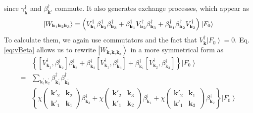 \documentclass[epj]{svjour}
\newcommand{\vk}{\ensuremath{\mathbf{k}}}
\begin{document}
since $\gamma^{\dagger}_{\mathbf{k}}$ and $\beta^{\dagger}_{\mathbf{k}'}$ commute.  It also generates exchange processes, which appear as 
\begin{equation}
\left|W_{\mathbf{k} _1\mathbf{k} _2\mathbf{k} _3}\right> =\left(V^{\dagger}_{\mathbf{k} _1}\beta^{\dagger}_{\mathbf{k}
_2}\beta^{\dagger}_{\mathbf{k} _3}+\beta^{\dagger}_{\mathbf{k}
_1}V^{\dagger}_{\mathbf{k} _2}\beta^{\dagger}_{\mathbf{k} _3}+\beta^{%
\dagger}_{\mathbf{k} _1}\beta^{\dagger}_{\mathbf{k} _2}V^{\dagger}_{\mathbf{k%
} _3}\right) \left|F_0\right>  
\end{equation}
To calculate them, we again use commutators and the fact that $V^{\dagger}_\vk\left|F_0\right>  =0$. 
Eq. \eqref{eq:vBeta} allows us to rewrite  $\left|W_{\mathbf{k} _1\mathbf{k} _2\mathbf{k} _3}\right>$ in a more symmetrical form as
\begin{equation}  \label{eq:vThree2}
\begin{split}
&\left\{\left[V^{\dagger}_{\mathbf{k} _1},\beta^{\dagger}_{\mathbf{k} _2}%
\right]  \beta^{\dagger}_{\mathbf{k} _3}+\beta^{\dagger}_{\mathbf{k} _2}%
\left[V^{\dagger}_{\mathbf{k} _1},\beta^{\dagger}_{\mathbf{k} _3}\right] 
+\beta^{\dagger}_{\mathbf{k} _1}\left[V^{\dagger}_{\mathbf{k}
_2},\beta^{\dagger}_{\mathbf{k} _3}\right]  \right\} \left|F_0\right>   \\
=&\sum_{\vk^{\prime}_1\mathbf{k} ^{\prime}_2}\beta^{\dagger}_{\mathbf{k}
^{\prime}_1}\beta^{\dagger}_{\mathbf{k} ^{\prime}_2} \\
&\left\{\chi\left(\begin{smallmatrix}\vk'_2&\vk_2\\\vk'_1&\vk_1%
\end{smallmatrix}\right)  \beta^{\dagger}_{\mathbf{k} _3}+\chi\left(%
\begin{smallmatrix}\vk'_2&\vk_3\\\vk'_1&\vk_2\end{smallmatrix}\right) 
\beta^{\dagger}_{\mathbf{k} _1}+\chi\left(\begin{smallmatrix}\vk'_2&\vk_1\
\\\vk'_1&\vk_3\end{smallmatrix}\right)  \beta^{\dagger}_{\mathbf{k}
_2}\right\} \left|F_0\right>  
\end{split}%
\end{equation}
\end{document}
